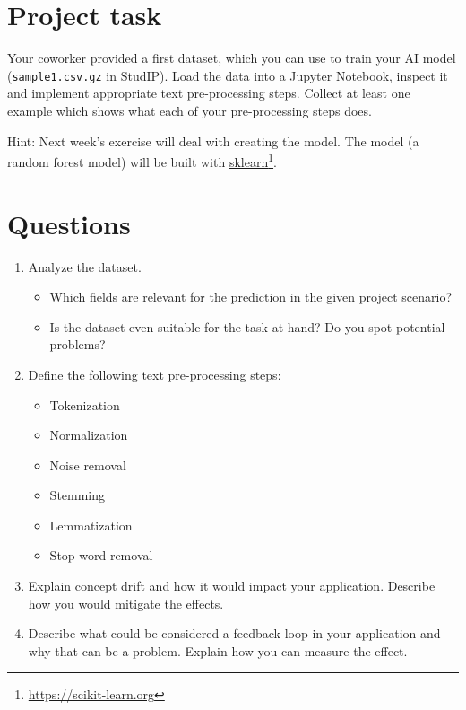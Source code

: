 

\newcommand{\dozenten}{Prof.~Dr.~Steffen Herbold}
\newcommand{\vorlesung}{Principles of AI Engineering}
\newcommand{\docauthor}{Lukas Schulte}
\newcommand{\semester}{}
\newcommand{\blattnummer}{2}
\newcommand{\bistermin}{}



\section*{Project task}

Your coworker provided a first dataset, which you can use to train your AI model (\texttt{sample1.csv.gz} in StudIP). Load the data into a Jupyter Notebook, inspect it and implement appropriate text pre-processing steps. Collect at least one example which shows what each of your pre-processing steps does.

\vspace{5px}

Hint:
Next week's exercise will deal with creating the model. The model (a random forest model) will be built with \href{https://scikit-learn.org}{sklearn}\footnote{\url{https://scikit-learn.org}}.

\section*{Questions}

\begin{enumerate}
      \item
            Analyze the dataset.
            \begin{itemize}
                  \item Which fields are relevant for the prediction in the given project scenario?
                  \item Is the dataset even suitable for the task at hand? Do you spot potential problems?
            \end{itemize}
      \item
            Define the following text pre-processing steps:
            \begin{itemize}
                  \item Tokenization
                  \item Normalization
                  \item Noise removal
                  \item Stemming
                  \item Lemmatization
                  \item Stop-word removal
            \end{itemize}
      \item
            Explain concept drift and how it would impact your application.
            Describe how you would mitigate the effects.
      \item
            Describe what could be considered a feedback loop in your application and why that can be a problem.
            Explain how you can measure the effect.
\end{enumerate}


